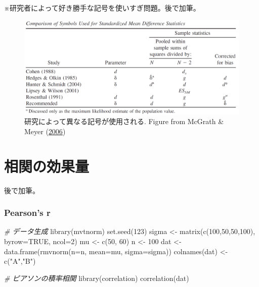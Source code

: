\documentclass[
  ja=standard, xelatex, base=12pt]{bxjsreport}
\newenvironment{Shaded}{\begin{snugshade}}{\end{snugshade}}
\newcommand{\AttributeTok}[1]{\textcolor[rgb]{0.77,0.63,0.00}{#1}}
\newcommand{\CommentTok}[1]{\textcolor[rgb]{0.56,0.35,0.01}{\textit{#1}}}
\newcommand{\ConstantTok}[1]{\textcolor[rgb]{0.00,0.00,0.00}{#1}}
\newcommand{\DecValTok}[1]{\textcolor[rgb]{0.00,0.00,0.81}{#1}}
\newcommand{\FunctionTok}[1]{\textcolor[rgb]{0.00,0.00,0.00}{#1}}
\newcommand{\NormalTok}[1]{#1}
\newcommand{\OtherTok}[1]{\textcolor[rgb]{0.56,0.35,0.01}{#1}}
\newcommand{\StringTok}[1]{\textcolor[rgb]{0.31,0.60,0.02}{#1}}
\begin{document}
※研究者によって好き勝手な記号を使いすぎ問題。後で加筆。

\begin{figure}
\centering
\includegraphics{images/McGrathMeyer2006.png}
\caption{研究によって異なる記号が使用される. Figure from McGrath \& Meyer (\protect\hyperlink{ref-mcgrath2006}{2006})}
\end{figure}

\hypertarget{ux76f8ux95a2ux306eux52b9ux679cux91cf}{%
\chapter{相関の効果量}\label{ux76f8ux95a2ux306eux52b9ux679cux91cf}}

後で加筆。

\hypertarget{pearsons-r}{%
\subsection{Pearson's r}\label{pearsons-r}}

\begin{Shaded}
\begin{Highlighting}[]
\CommentTok{\# データ生成}
\FunctionTok{library}\NormalTok{(mvtnorm)}
\FunctionTok{set.seed}\NormalTok{(}\DecValTok{123}\NormalTok{)}
\NormalTok{sigma }\OtherTok{\textless{}{-}} \FunctionTok{matrix}\NormalTok{(}\FunctionTok{c}\NormalTok{(}\DecValTok{100}\NormalTok{,}\DecValTok{50}\NormalTok{,}\DecValTok{50}\NormalTok{,}\DecValTok{100}\NormalTok{), }\AttributeTok{byrow=}\ConstantTok{TRUE}\NormalTok{, }\AttributeTok{ncol=}\DecValTok{2}\NormalTok{) }
\NormalTok{mu }\OtherTok{\textless{}{-}} \FunctionTok{c}\NormalTok{(}\DecValTok{50}\NormalTok{, }\DecValTok{60}\NormalTok{)}
\NormalTok{n }\OtherTok{\textless{}{-}} \DecValTok{100}
\NormalTok{dat }\OtherTok{\textless{}{-}} \FunctionTok{data.frame}\NormalTok{(}\FunctionTok{rmvnorm}\NormalTok{(}\AttributeTok{n=}\NormalTok{n, }\AttributeTok{mean=}\NormalTok{mu, }\AttributeTok{sigma=}\NormalTok{sigma)) }
\FunctionTok{colnames}\NormalTok{(dat) }\OtherTok{\textless{}{-}} \FunctionTok{c}\NormalTok{(}\StringTok{"A"}\NormalTok{,}\StringTok{"B"}\NormalTok{)}

\CommentTok{\# ピアソンの積率相関}
\FunctionTok{library}\NormalTok{(correlation)}
\FunctionTok{correlation}\NormalTok{(dat)}
\end{Highlighting}
\end{Shaded}
\end{document}
